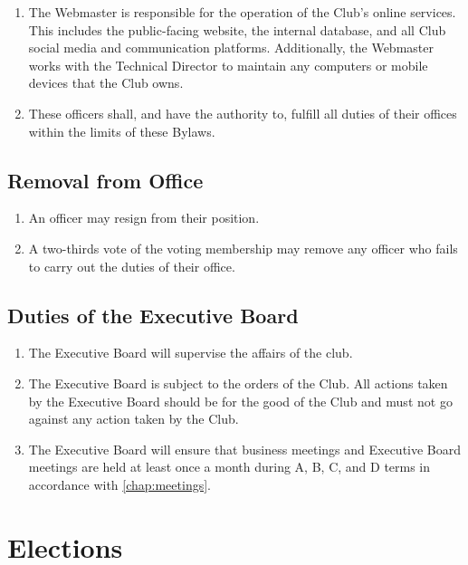 \documentclass[12pt,letterpaper,oneside]{book}
\begin{document}
\begin{enumerate}
\item The Webmaster is responsible for the operation of the Club’s online services. This includes the public-facing website, the internal database, and all Club social media and communication platforms. Additionally, the Webmaster works with the Technical Director to maintain any computers or mobile devices that the Club owns.
\item These officers shall, and have the authority to, fulfill all duties of their offices within the limits of these Bylaws.

\end{enumerate}

\section{Removal from Office}

\begin{enumerate}

\item An officer may resign from their position.
\item A two-thirds vote of the voting membership may remove any officer who fails to carry out the duties of their office.

\end{enumerate}

\section{Duties of the Executive Board}

\begin{enumerate}

\item The Executive Board will supervise the affairs of the club.
\item The Executive Board is subject to the orders of the Club. All actions taken by the Executive Board should be for the good of the Club and must not go against any action taken by the Club.
\item The Executive Board will ensure that business meetings and Executive Board meetings are held at least once a month during A, B, C, and D terms in accordance with \cref{chap:meetings}.
\end{enumerate}

\chapter{Elections}
\end{document}

